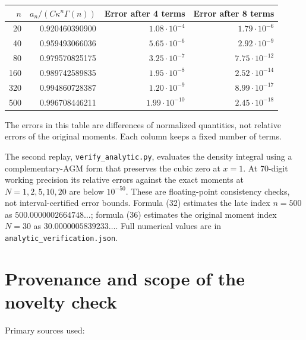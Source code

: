 \documentclass[11pt,letterpaper]{article}
\theoremstyle{remark}
\begin{document}
\begin{center}
\begin{tabular}{rrrr}
\toprule
$n$ & $a_n/(C\kappa^n\Gamma(n))$ & Error after 4 terms & Error after 8 terms\\
\midrule
20 & 0.920460390900 & $1.08\cdot10^{-4}$ & $1.79\cdot10^{-6}$\\
40 & 0.959493066036 & $5.65\cdot10^{-6}$ & $2.92\cdot10^{-9}$\\
80 & 0.979570825175 & $3.25\cdot10^{-7}$ & $7.75\cdot10^{-12}$\\
160 & 0.989742589835 & $1.95\cdot10^{-8}$ & $2.52\cdot10^{-14}$\\
320 & 0.994860728387 & $1.20\cdot10^{-9}$ & $8.99\cdot10^{-17}$\\
500 & 0.996708446211 & $1.99\cdot10^{-10}$ & $2.45\cdot10^{-18}$\\
\bottomrule
\end{tabular}
\end{center}
The errors in this table are differences of normalized quantities, not relative errors of the original moments. Each column keeps a fixed number of terms.

The second replay, \texttt{verify\_analytic.py}, evaluates the density integral using a complementary-AGM form that preserves the cubic zero at $x=1$. At 70-digit working precision its relative errors against the exact moments at $N=1,2,5,10,20$ are below $10^{-50}$. These are floating-point consistency checks, not interval-certified error bounds. Formula (32) estimates the late index $n=500$ as $500.0000002664748\ldots$; formula (36) estimates the original moment index $N=30$ as $30.0000005839233\ldots$. Full numerical values are in \texttt{analytic\_verification.json}.

\section{Provenance and scope of the novelty
check}\label{provenance-and-scope-of-the-novelty-check}

Primary sources used:
\end{document}

